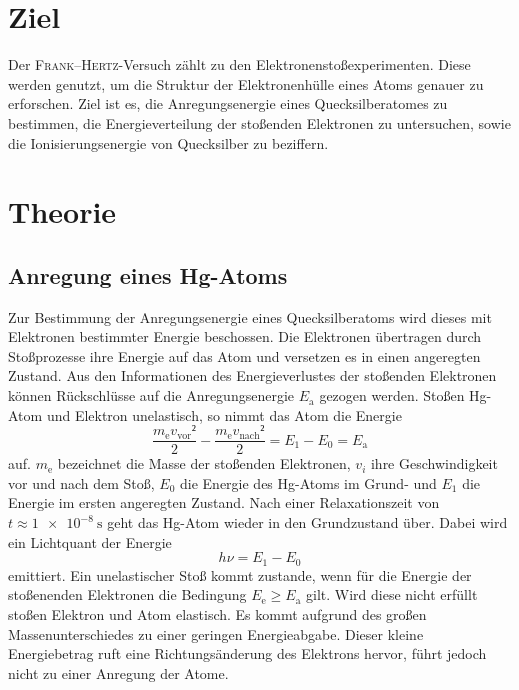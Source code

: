 \section{Ziel}
\label{sec:Ziel}
Der \textsc{Frank}--\textsc{Hertz}-Versuch zählt zu den Elektronenstoßexperimenten. 
Diese werden genutzt, um die Struktur der Elektronenhülle eines Atoms genauer zu erforschen.
Ziel ist es, die Anregungsenergie eines Quecksilberatomes zu bestimmen, die Energieverteilung der stoßenden Elektronen zu untersuchen, sowie die Ionisierungsenergie von Quecksilber zu beziffern.

\section{Theorie}
\label{sec:Theorie}
\subsection{Anregung eines Hg-Atoms}
Zur Bestimmung der Anregungsenergie eines Quecksilberatoms wird dieses mit Elektronen bestimmter Energie beschossen.
Die Elektronen übertragen durch Stoßprozesse ihre Energie auf das Atom und versetzen es in einen angeregten Zustand.
Aus den Informationen des Energieverlustes der stoßenden Elektronen können Rückschlüsse auf die Anregungsenergie $E_\mathup{a}$ gezogen werden. 
Stoßen Hg-Atom und Elektron unelastisch, so nimmt das Atom die Energie
\begin{equation}
	\label{eq:E_a}
	\frac{m_\mathup{e} v_\mathup{vor}²}{2}-\frac{m_\mathup{e} 	v_\mathup{nach}²}{2}=E_1-E_0=E_\mathup{a}
\end{equation}
auf.
$m_\mathup{e}$ bezeichnet die Masse der stoßenden Elektronen, $v_i$ ihre Geschwindigkeit vor und nach dem Stoß, $E_0$ die Energie des Hg-Atoms im Grund- und $E_1$ die Energie im ersten angeregten Zustand. 
Nach einer Relaxationszeit von $t \approx \SI{1e-8}{\second}$ geht das Hg-Atom wieder in den Grundzustand über. Dabei wird ein Lichtquant der Energie
\begin{equation}
	h \nu =E_1-E_0
\end{equation}
emittiert.
Ein unelastischer Stoß kommt zustande, wenn für die Energie der stoßenenden Elektronen die Bedingung $E_\mathup{e} \geq E_\mathup{a}$ gilt. 
Wird diese nicht erfüllt stoßen Elektron und Atom elastisch. 
Es kommt aufgrund des großen Massenunterschiedes zu einer geringen Energieabgabe.
Dieser kleine Energiebetrag ruft eine Richtungsänderung des Elektrons hervor, führt jedoch nicht zu einer Anregung der Atome.

